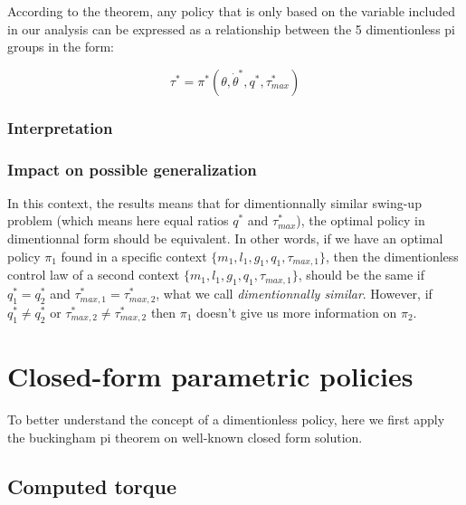 
According to the theorem, any policy that is only based on the variable included in our analysis can be expressed as a relationship between the 5 dimentionless pi groups in the form:

\begin{equation}
\tau^*
=
\pi^* \left(
\theta, \dot{\theta}^*,
q^* , \tau_{max}^* 
\right)
\end{equation}

\subsubsection{Interpretation}

\subsubsection{Impact on possible generalization}

In this context, the results means that for dimentionnally similar swing-up problem (which means here equal ratios $q^*$ and $\tau_{max}^*$), the optimal policy in dimentionnal form should be equivalent. In other words, if we have an optimal policy $\pi_1$ found in a specific context $\{m_1,l_1,g_1,q_1,\tau_{max,1}\}$, then the dimentionless control law of a second context $\{m_1,l_1,g_1,q_1,\tau_{max,1}\}$, should be the same if $q^*_1 = q^*_2$ and $\tau_{max,1}^* = \tau_{max,2}^*$, what we call \textit{dimentionnally similar}. However, if $q^*_1 \neq q^*_2$ or $\tau_{max,2}^* \neq \tau_{max,2}^*$ then $\pi_1$ doesn't give us more information on $\pi_2$.





\newpage
\section{Closed-form parametric policies}

To better understand the concept of a dimentionless policy, here we first apply the buckingham pi theorem on well-known closed form solution.

\subsection{Computed torque}


